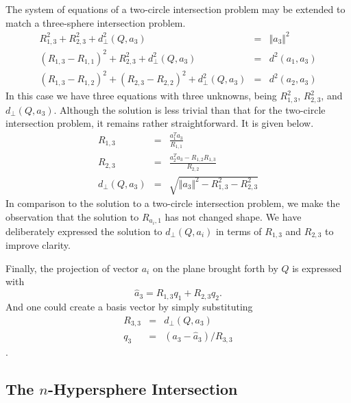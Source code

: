 \documentclass{article}
\newcommand{\sv}{Q}
\newcommand{\sve}{q}
\newcommand{\nonsve}{a}
\newcommand{\ce}{R}
\begin{document}
The system of equations of a two-circle intersection problem may be
extended to match a three-sphere intersection problem. \begin{eqnarray*}
\ce_{1,3}^{2}+\ce_{2,3}^{2}+d_{\perp}^{2}(\sv,\nonsve_{3}) & = & \Vert\nonsve_{3}\Vert^{2}\\
(\ce_{1,3}-\ce_{1,1})^{2}+\ce_{2,3}^{2}+d_{\perp}^{2}(\sv,\nonsve_{3}) & = & d^{2}(\nonsve_{1},\nonsve_{3})\\
(\ce_{1,3}-\ce_{1,2})^{2}+(\ce_{2,3}-\ce_{2,2})^{2}+d_{\perp}^{2}(\sv,\nonsve_{3}) & = & d^{2}(\nonsve_{2},\nonsve_{3})\end{eqnarray*}
 In this case we have three equations with three unknowns, being $\ce_{1,3}^{2}$,
$\ce_{2,3}^{2}$, and $d_{\perp}(\sv,\nonsve_{3})$. Although the
solution is less trivial than that for the two-circle intersection
problem, it remains rather straightforward. It is given below.\begin{eqnarray*}
\ce_{1,3} & = & \frac{\nonsve_{1}^{T}\nonsve_{3}}{\ce_{1,1}}\\
\ce_{2,3} & = & \frac{\nonsve_{2}^{T}\nonsve_{3}-\ce_{1,2}\ce_{1,3}}{\ce_{2,2}}\\
d_{\perp}(\sv,\nonsve_{3}) & = & \sqrt{\Vert\nonsve_{3}\Vert^{2}-\ce_{1,3}^{2}-\ce_{2,3}^{2}}\end{eqnarray*}
In comparison to the solution to a two-circle intersection problem,
we make the observation that the solution to $\ce_{\nonsve_{i},1}$
has not changed shape. We have deliberately expressed the solution
to $d_{\perp}(\sv,\nonsve_{i})$ in terms of $\ce_{1,3}$ and $\ce_{2,3}$
to improve clarity.

Finally, the projection of vector $\nonsve_{i}$ on the plane brought
forth by $\sv$ is expressed with \[
\hat{\nonsve}_{3}=\ce_{1,3}\sve_{1}+\ce_{2,3}\sve_{2}.\]
And one could create a basis vector by simply substituting \begin{eqnarray*}
\ce_{3,3} & = & d_{\perp}(\sv,\nonsve_{3})\\
\sve_{3} & = & (\nonsve_{3}-\hat{\nonsve}_{3})/\ce_{3,3}\end{eqnarray*}
.


\subsection{The $n$-Hypersphere Intersection\label{subsection:hypersphere_intersection}}
\end{document}
